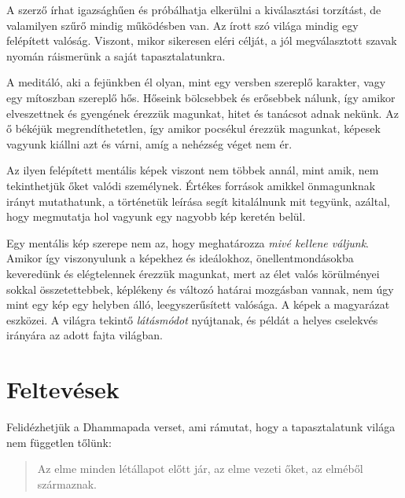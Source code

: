 A szerző írhat igazsághűen és próbálhatja elkerülni a kiválasztási torzítást,
de valamilyen szűrő mindig működésben van. Az írott szó
világa mindig egy felépített valóság. Viszont, mikor sikeresen eléri
célját, a jól megválasztott szavak nyomán ráismerünk a saját
tapasztalatunkra.

\clearpage

\vspace*{-\baselineskip}


A meditáló, aki a fejünkben él olyan, mint egy versben szereplő
karakter, vagy egy mítoszban szereplő hős. Hőseink bölcsebbek és
erősebbek nálunk, így amikor elveszettnek és gyengének érezzük magunkat,
hitet és tanácsot adnak nekünk. Az ő békéjük megrendíthetetlen, így
amikor pocsékul érezzük magunkat, képesek vagyunk kiállni azt és várni,
amíg a nehézség véget nem ér.

Az ilyen felépített mentális képek viszont nem többek annál, mint amik,
nem tekinthetjük őket valódi személynek. Értékes források amikkel
önmagunknak irányt mutathatunk, a történetük leírása segít kitalálnunk
mit tegyünk, azáltal, hogy megmutatja hol vagyunk egy nagyobb kép
keretén belül.

Egy mentális kép szerepe nem az, hogy meghatározza \emph{mivé kellene
váljunk}. Amikor így viszonyulunk a képekhez és ideálokhoz,
önellentmondásokba keveredünk és elégtelennek érezzük magunkat, mert az
élet valós körülményei sokkal összetettebbek, képlékeny és változó
határai mozgásban vannak, nem úgy mint egy kép egy helyben álló,
leegyszerűsített valósága. A képek a magyarázat eszközei. A világra
tekintő \emph{látásmódot} nyújtanak, és példát a helyes cselekvés
irányára az adott fajta világban.

\clearpage

\section{Feltevések}


\noindent Felidézhetjük a Dhammapada verset, ami rámutat, hogy a
tapasztalatunk világa nem független tőlünk:

\begin{quote}
Az elme minden létállapot előtt jár, az elme vezeti őket, az elméből
származnak.

\bigskip

\end{quote}


